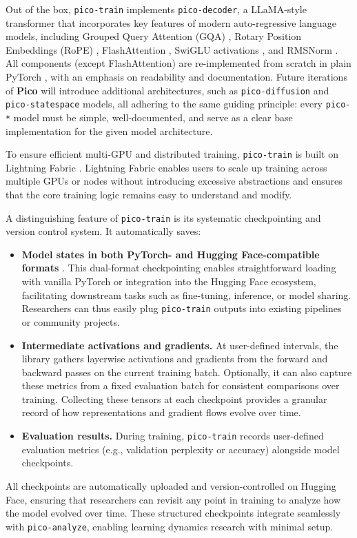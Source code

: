 Out of the box, \texttt{pico-train} implements \texttt{pico-decoder}, a LLaMA-style transformer \citep{touvron2023llama} that incorporates key features of modern auto-regressive language models, including Grouped Query Attention (GQA) \citep{ainslie2023gqa}, Rotary Position Embeddings (RoPE) \citep{su2024rope}, FlashAttention \citep{dao2022flashattention}, SwiGLU activations \citep{shazeer2020glu}, and RMSNorm \citep{zhang2019rmsnorm}. All components (except FlashAttention) are re-implemented from scratch in plain PyTorch \citep{paszke2017pytorch}, with an emphasis on readability and documentation. Future iterations of \textbf{Pico} will introduce additional architectures, such as \texttt{pico-diffusion} and \texttt{pico-statespace} models, all adhering to the same guiding principle: every \texttt{pico-*} model must be simple, well-documented, and serve as a clear base implementation for the given model architecture.

To ensure efficient multi-GPU and distributed training, \texttt{pico-train} is built on Lightning Fabric \citep{lightning-fabric}. Lightning Fabric enables users to scale up training across multiple GPUs or nodes without introducing excessive abstractions and ensures that the core training logic remains easy to understand and modify.

A distinguishing feature of \texttt{pico-train} is its systematic checkpointing and version control system. It automatically saves:
\begin{itemize}
    \item \textbf{Model states in both PyTorch- and Hugging Face-compatible formats} \citep{huggingface}. This dual-format checkpointing enables straightforward loading with vanilla PyTorch or integration into the Hugging Face ecosystem, facilitating downstream tasks such as fine-tuning, inference, or model sharing. Researchers can thus easily plug \texttt{pico-train} outputs into existing pipelines or community projects.

    \item \textbf{Intermediate activations and gradients.} At user-defined intervals, the library gathers layerwise activations and gradients from the forward and backward passes on the current training batch. Optionally, it can also capture these metrics from a fixed evaluation batch for consistent comparisons over training. Collecting these tensors at each checkpoint provides a granular record of how representations and gradient flows evolve over time.

    \item \textbf{Evaluation results.} During training, \texttt{pico-train} records user-defined evaluation metrics (e.g., validation perplexity or accuracy) alongside model checkpoints.
\end{itemize}
\vspace{-0.2em}
All checkpoints are automatically uploaded and version-controlled on Hugging Face, ensuring that researchers can revisit any point in training to analyze how the model evolved over time. These structured checkpoints integrate seamlessly with \texttt{pico-analyze}, enabling learning dynamics research with minimal setup.

